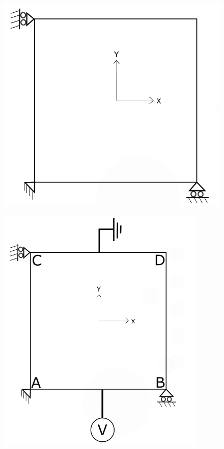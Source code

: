 \documentclass[11pt]{article}
\begin{document}
\begin{figure}[H]
	\centering
	\begin{minipage}{.5\textwidth}
		\centering
		\includegraphics[width=0.8\linewidth]{2DPlate.png}
		\label{2Dplate}
	\end{minipage}%
	\begin{minipage}{.4\textwidth}
		\centering
		\includegraphics[width=1\linewidth]{PureElectrical.png}
		\label{PureElectrical}
	\end{minipage}
\end{figure}
\end{document}
